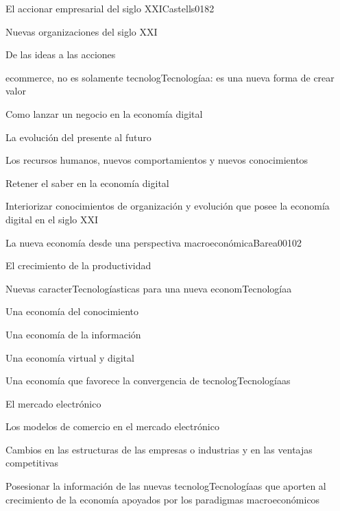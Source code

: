 \begin{syllabus}
\begin{unit}{El accionar empresarial del siglo XXI}{Castells01}{8}{2}
   \begin{topics}
      \item Nuevas organizaciones del siglo XXI
	\item De las ideas a las acciones
	\item ecommerce, no es solamente tecnologTecnologíaa: es una nueva forma de crear valor
	\item Como lanzar un negocio en la economía digital
	\item La evolución del presente al futuro
	\item Los recursos humanos, nuevos comportamientos y nuevos conocimientos
	\item Retener el saber en la economía digital
   \end{topics}

   \begin{unitgoals}
      \item Interiorizar conocimientos de organización y evolución que posee la economía digital en el siglo XXI
   \end{unitgoals}
\end{unit}

\begin{unit}{La nueva economía desde una perspectiva macroeconómica}{Barea00}{10}{2}
   \begin{topics}
      \item El crecimiento de la productividad
	\item Nuevas caracterTecnologíasticas para una nueva economTecnologíaa
	\item Una economía del conocimiento
	\item Una economía de la información
	\item Una economía virtual y digital
	\item Una economía que favorece la convergencia de tecnologTecnologíaas
	\item El mercado electrónico
	\item Los modelos de comercio en el mercado electrónico
	\item Cambios en las estructuras de las empresas o industrias y en las ventajas competitivas
  \end{topics}

   \begin{unitgoals}
      \item Posesionar la información de las nuevas tecnologTecnologíaas que aporten al crecimiento de la economía apoyados por los paradigmas macroeconómicos
   \end{unitgoals}
\end{unit}


\end{syllabus}
